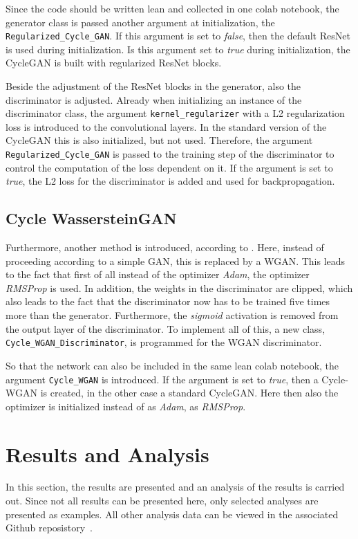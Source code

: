 \documentclass[fleqn,10pt]{SelfArx} %
\begin{document}
Since the code should be written lean and collected in one colab notebook, the generator class is passed another argument at initialization, the \texttt{Regularized\_Cycle\_GAN}. If this argument is set to \textit{false}, then the default \ac{ResNet} is used during initialization. Is this argument set to \textit{true} during initialization, the Cycle\ac{GAN} is built with regularized \ac{ResNet} blocks.

Beside the adjustment of the \ac{ResNet} blocks in the generator, also the discriminator is adjusted. Already when initializing an instance of the discriminator class, the argument \texttt{kernel\_regularizer} with a L2 regularization loss is introduced to the convolutional layers. In the standard version of the Cycle\ac{GAN} this is also initialized, but not used. Therefore, the argument \texttt{Regularized\_Cycle\_GAN} is passed to the training step of the discriminator to control the computation of the loss dependent on it. If the argument is set to \textit{true}, the L2 loss for the discriminator is added and used for backpropagation.


\subsection{Cycle Wasserstein\ac{GAN}}
Furthermore, another method is introduced, according to \cite{wgan-improvement}. Here, instead of proceeding according to a simple \ac{GAN}, this is replaced by a \ac{WGAN}. This leads to the fact that first of all instead of the optimizer \textit{Adam}, the optimizer \textit{\ac{RMSProp}} is used. In addition, the weights in the discriminator are clipped, which also leads to the fact that the discriminator now has to be trained five times more than the generator. Furthermore, the \textit{sigmoid} activation is removed from the output layer of the discriminator. To implement all of this, a new class, \texttt{Cycle\_WGAN\_Discriminator}, is programmed for the \ac{WGAN} discriminator.

So that the network can also be included in the same lean colab notebook, the argument \texttt{Cycle\_WGAN} is introduced. If the argument is set to \textit{true}, then a Cycle-\ac{WGAN} is created, in the other case a standard Cycle\ac{GAN}. Here then also the optimizer is initialized instead of as \textit{Adam}, as \textit{\ac{RMSProp}}.


\section{Results and Analysis}
In this section, the results are presented and an analysis of the results is carried out. Since not all results can be presented here, only selected analyses are presented as examples. All other analysis data can be viewed in the associated Github reposistory~\cite{ourGithubRepo}.
\end{document}

